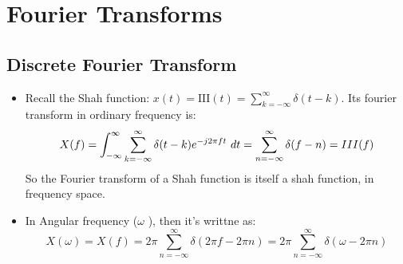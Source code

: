 \section{Fourier Transforms}
\subsection{Discrete Fourier Transform}
\begin{itemize}
	\item Recall the Shah function: \( x(t) = \text{III}(t) = \sum_{k = -\infty}^{\infty}\delta(t - k) \). Its 
		fourier transform in ordinary frequency is: 
		\[
		X(f) = \int_{-\infty}^{\infty} \sum_{k = -\infty}^{\infty} \delta(t - k) e^{-j 2 \pi f t}\ d t
		= \sum_{n = -\infty}^{\infty} \delta(f - n) = III(f)
		\] 
		So the Fourier transform of a Shah function is itself a shah function, in frequency space.  
	\item In Angular frequency (\( \omega \) ), then it's writtne as: 
		\[
		X(\omega) = X(f) = 2\pi \sum_{n = -\infty}^{\infty} \delta(2 \pi f - 2\pi n) = 2\pi \sum_{n = -\infty}^{\infty}
		\delta(\omega - 2 \pi n)
		\] 
\end{itemize}
